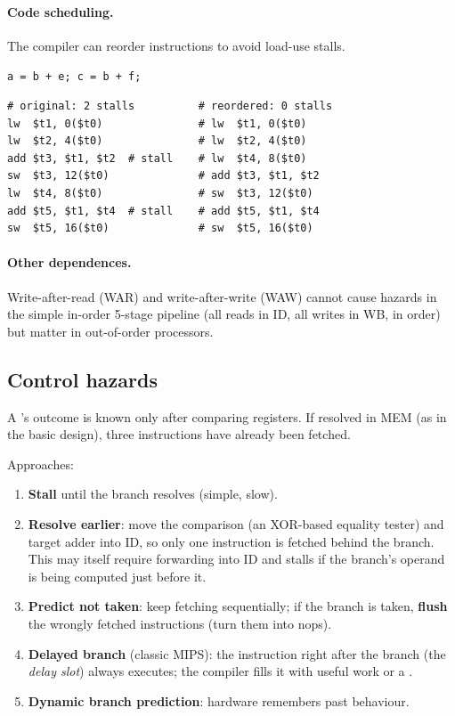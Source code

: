 \paragraph{Code scheduling.} The compiler can reorder instructions to avoid
load-use stalls.
\begin{example}
\lstinline[style=c]|a = b + e; c = b + f;|
\begin{lstlisting}[style=mips]
# original: 2 stalls          # reordered: 0 stalls
lw  $t1, 0($t0)               # lw  $t1, 0($t0)
lw  $t2, 4($t0)               # lw  $t2, 4($t0)
add $t3, $t1, $t2  # stall    # lw  $t4, 8($t0)
sw  $t3, 12($t0)              # add $t3, $t1, $t2
lw  $t4, 8($t0)               # sw  $t3, 12($t0)
add $t5, $t1, $t4  # stall    # add $t5, $t1, $t4
sw  $t5, 16($t0)              # sw  $t5, 16($t0)
\end{lstlisting}
\end{example}

\paragraph{Other dependences.} Write-after-read (WAR) and write-after-write
(WAW) cannot cause hazards in the simple in-order 5-stage pipeline (all
reads in ID, all writes in WB, in order) but matter in out-of-order
processors.

\subsection{Control hazards}

A 's outcome is known only after comparing registers. If resolved
in MEM (as in the basic design), three instructions have already been
fetched.

Approaches:
\begin{enumerate}
  \item \textbf{Stall} until the branch resolves (simple, slow).
  \item \textbf{Resolve earlier}: move the comparison (an XOR-based equality
    tester) and target adder into ID, so only one instruction is fetched
    behind the branch. This may itself require forwarding into ID and
    stalls if the branch's operand is being computed just before it.
  \item \textbf{Predict not taken}: keep fetching sequentially; if the branch
    is taken, \textbf{flush} the wrongly fetched instructions (turn them into
    nops).
  \item \textbf{Delayed branch} (classic MIPS): the instruction right after
    the branch (the \emph{delay slot}) always executes; the compiler fills
    it with useful work or a .
  \item \textbf{Dynamic branch prediction}: hardware remembers past
    behaviour.
\end{enumerate}

